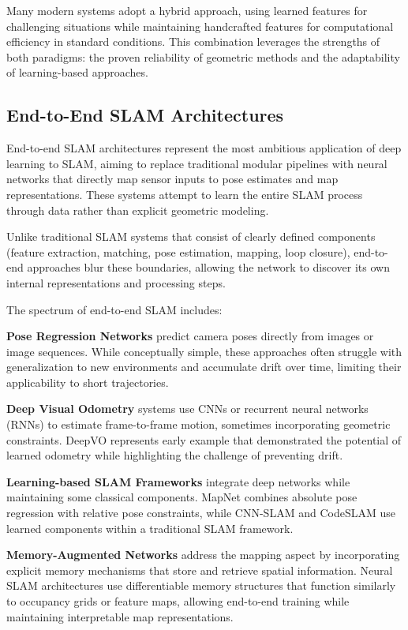 \documentclass[12pt]{article}
\begin{document}
    Many modern systems adopt a hybrid approach, using learned features for challenging situations while maintaining handcrafted features for computational efficiency in standard conditions. 
    This combination leverages the strengths of both paradigms: the proven reliability of geometric methods and the adaptability of learning-based approaches.
    
    \newpage
    \subsection{End-to-End SLAM Architectures}
    
    End-to-end SLAM architectures represent the most ambitious application of deep learning to SLAM, aiming to replace traditional modular pipelines with neural networks that directly map 
    sensor inputs to pose estimates and map representations. These systems attempt to learn the entire SLAM process through data rather than explicit geometric modeling.
    
    Unlike traditional SLAM systems that consist of clearly defined components (feature extraction, matching, pose estimation, mapping, loop closure), end-to-end approaches blur these boundaries, 
    allowing the network to discover its own internal representations and processing steps.
    
    The spectrum of end-to-end SLAM includes:
    
    \textbf{Pose Regression Networks} predict camera poses directly from images or image sequences. While conceptually simple, these approaches often struggle with generalization to new environments and accumulate drift over time, 
    limiting their applicability to short trajectories.
    
    \textbf{Deep Visual Odometry} systems use CNNs or recurrent neural networks (RNNs) to estimate frame-to-frame motion, sometimes incorporating geometric constraints. DeepVO \cite{deepvo} represents early example 
    that demonstrated the potential of learned odometry while highlighting the challenge of preventing drift.
    
    \textbf{Learning-based SLAM Frameworks} integrate deep networks while maintaining some classical components. MapNet \cite{mapnet} combines absolute pose regression with relative pose constraints, while CNN-SLAM \cite{cnnslam} 
    and CodeSLAM \cite{codeslam} use learned components within a traditional SLAM framework.
    
    \textbf{Memory-Augmented Networks} address the mapping aspect by incorporating explicit memory mechanisms that store and retrieve spatial information. Neural SLAM architectures use differentiable memory structures 
    that function similarly to occupancy grids or feature maps, allowing end-to-end training while maintaining interpretable map representations.
    
\end{document}
